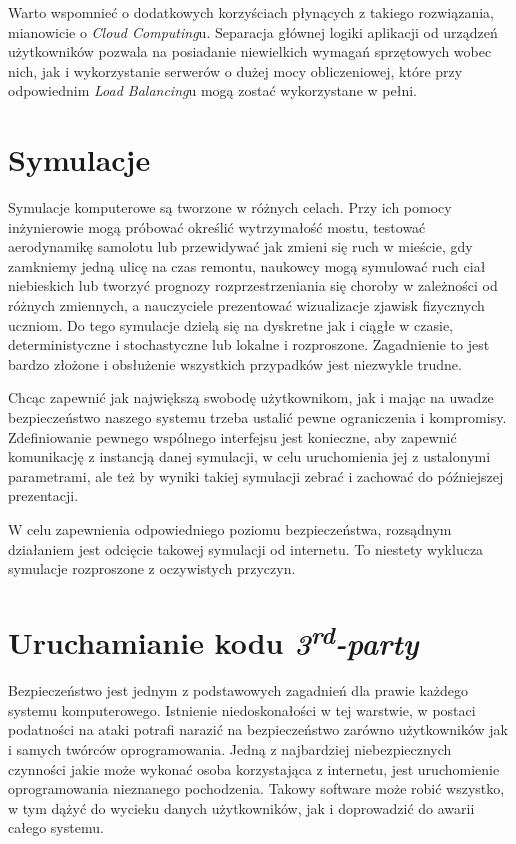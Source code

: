 \par Warto wspomnieć o dodatkowych korzyściach płynących z takiego rozwiązania, mianowicie o \emph{Cloud Computing}u. Separacja głównej logiki aplikacji od urządzeń użytkowników pozwala na posiadanie niewielkich wymagań sprzętowych wobec nich, jak i wykorzystanie serwerów o dużej mocy obliczeniowej, które przy odpowiednim \emph{Load Balancing}u mogą zostać wykorzystane w pełni.

\section{Symulacje}

\par Symulacje komputerowe są tworzone w różnych celach. Przy ich pomocy inżynierowie mogą próbować określić wytrzymałość mostu, testować aerodynamikę samolotu lub przewidywać jak zmieni się ruch w mieście, gdy zamkniemy jedną ulicę na czas remontu, naukowcy mogą symulować ruch ciał niebieskich lub tworzyć prognozy rozprzestrzeniania się choroby w zależności od różnych zmiennych, a nauczyciele prezentować wizualizacje zjawisk fizycznych uczniom. Do tego symulacje dzielą się na dyskretne jak i ciągłe w czasie, deterministyczne i stochastyczne lub lokalne i rozproszone. Zagadnienie to jest bardzo złożone i obsłużenie wszystkich przypadków jest niezwykle trudne.

\par Chcąc zapewnić jak największą swobodę użytkownikom, jak i mając na uwadze bezpieczeństwo naszego systemu trzeba ustalić pewne ograniczenia i kompromisy. Zdefiniowanie pewnego wspólnego interfejsu jest konieczne, aby zapewnić komunikację z instancją danej symulacji, w celu uruchomienia jej z ustalonymi parametrami, ale też by wyniki takiej symulacji zebrać i zachować do późniejszej prezentacji.

\par W celu zapewnienia odpowiedniego poziomu bezpieczeństwa, rozsądnym działaniem jest odcięcie takowej symulacji od internetu. To niestety wyklucza symulacje rozproszone z oczywistych przyczyn.

\section{Uruchamianie kodu \emph{3\textsuperscript{rd}-party}}

\par Bezpieczeństwo jest jednym z podstawowych zagadnień dla prawie każdego systemu komputerowego. Istnienie niedoskonałości w tej warstwie, w postaci podatności na ataki potrafi narazić na bezpieczeństwo zarówno użytkowników jak i samych twórców oprogramowania. Jedną z najbardziej niebezpiecznych czynności jakie może wykonać osoba korzystająca z internetu, jest uruchomienie oprogramowania nieznanego pochodzenia. Takowy software może robić wszystko, w tym dążyć do wycieku danych użytkowników, jak i doprowadzić do awarii całego systemu.

